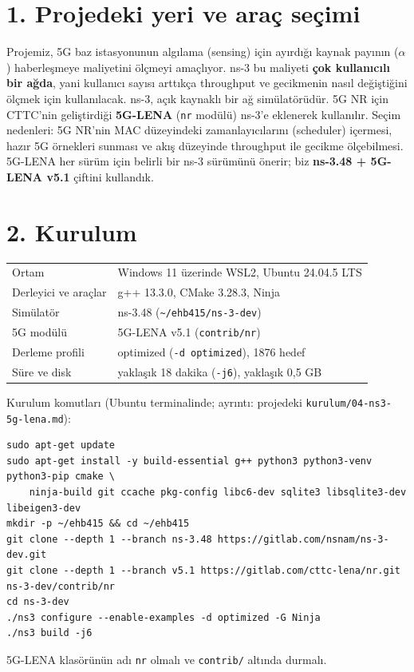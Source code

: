 \documentclass[10.5pt,a4paper]{article}
\begin{document}

\section*{1. Projedeki yeri ve araç seçimi}
Projemiz, 5G baz istasyonunun algılama (sensing) için ayırdığı kaynak payının ($\alpha$) haberleşmeye maliyetini ölçmeyi amaçlıyor. ns-3 bu maliyeti \textbf{çok kullanıcılı bir ağda}, yani kullanıcı sayısı arttıkça throughput ve gecikmenin nasıl değiştiğini ölçmek için kullanılacak. ns-3, açık kaynaklı bir ağ simülatörüdür. 5G NR için CTTC'nin geliştirdiği \textbf{5G-LENA} (\texttt{nr} modülü) ns-3'e eklenerek kullanılır. Seçim nedenleri: 5G NR'nin MAC düzeyindeki zamanlayıcılarını (scheduler) içermesi, hazır 5G örnekleri sunması ve akış düzeyinde throughput ile gecikme ölçebilmesi. 5G-LENA her sürüm için belirli bir ns-3 sürümünü önerir; biz \textbf{ns-3.48 + 5G-LENA v5.1} çiftini kullandık.

\section*{2. Kurulum}
\begin{center}\sffamily\small
\begin{tabular}{@{}ll@{}}
\toprule
Ortam & Windows 11 üzerinde WSL2, Ubuntu 24.04.5 LTS \\
Derleyici ve araçlar & g++ 13.3.0, CMake 3.28.3, Ninja \\
Simülatör & ns-3.48 (\texttt{\textasciitilde/ehb415/ns-3-dev}) \\
5G modülü & 5G-LENA v5.1 (\texttt{contrib/nr}) \\
Derleme profili & optimized (\texttt{-d optimized}), 1876 hedef \\
Süre ve disk & yaklaşık 18 dakika (\texttt{-j6}), yaklaşık 0,5 GB \\
\bottomrule
\end{tabular}
\end{center}
Kurulum komutları (Ubuntu terminalinde; ayrıntı: projedeki \texttt{kurulum/04-ns3-5g-lena.md}):
\begin{lstlisting}
sudo apt-get update
sudo apt-get install -y build-essential g++ python3 python3-venv python3-pip cmake \
    ninja-build git ccache pkg-config libc6-dev sqlite3 libsqlite3-dev libeigen3-dev
mkdir -p ~/ehb415 && cd ~/ehb415
git clone --depth 1 --branch ns-3.48 https://gitlab.com/nsnam/ns-3-dev.git
git clone --depth 1 --branch v5.1 https://gitlab.com/cttc-lena/nr.git ns-3-dev/contrib/nr
cd ns-3-dev
./ns3 configure --enable-examples -d optimized -G Ninja
./ns3 build -j6
\end{lstlisting}
5G-LENA klasörünün adı \texttt{nr} olmalı ve \texttt{contrib/} altında durmalı.
\end{document}
